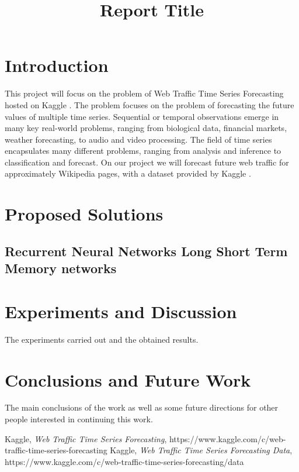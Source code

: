 \documentclass[conference]{IEEEtran}
\begin{document}
\title{Report Title}

\author{
\and
{}
\and
{}
\and
{}
}

\maketitle

\section{Introduction}

This project will focus on the problem of Web Traffic Time Series Forecasting hosted on Kaggle \cite{kaggle}.
The problem focuses on the problem of forecasting the future values of multiple time series. Sequential or temporal observations emerge in many key real-world problems, ranging from biological data, financial markets, weather forecasting, to audio and video processing. The field of time series encapsulates many different problems, ranging from analysis and inference to classification and forecast. On our project we will forecast future web traffic for approximately Wikipedia pages, with a dataset provided by Kaggle \cite{kaggle_data}.

\section{Proposed Solutions}
\subsection{Recurrent Neural Networks \- Long Short Term Memory networks}

\section{Experiments and Discussion}

The experiments carried out and the obtained
results.

\section{Conclusions and Future Work}

The main conclusions of the work as well as some future directions for other people interested in continuing this work. 

\begin{thebibliography}{00}
  Kaggle,
  \textit{Web Traffic Time Series Forecasting},
  https://www.kaggle.com/c/web-traffic-time-series-forecasting
  Kaggle,
  \textit{Web Traffic Time Series Forecasting Data},
  https://www.kaggle.com/c/web-traffic-time-series-forecasting/data
\end{thebibliography}
\end{document}
